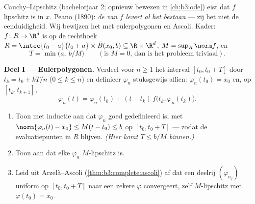 \begin{problem}[{Weekendopgave --- bestaan van oplossingen van $x'
= f(t, x)$ zonder Lipschitz}]\label{pb:b3:complete:1}
Cauchy--Lipschitz (bachelorjaar 2; opnieuw bewezen in
\cref{ch:b3:ode}) eist dat $f$ lipschitz is in $x$. Peano (1890):
\emph{de  van $f$ levert al het bestaan} --- zij het
niet de eenduidigheid. Wij bewijzen het met eulerpolygonen en
Ascoli. Kader: $f \colon R \to \R^d$ is  op de rechthoek $R
= \intcc{t_0 - a}{t_0 + a}\times \bar B(x_0, b) \subseteq
\R\times\R^d$, $M = \sup_R\norm f$, en
\[
T = \min\bigl(a,\ b/M\bigr)
\qquad (\text{is } M = 0 \text{, dan is het probleem triviaal}).
\]

\medskip
\noindent\textbf{Deel I --- Eulerpolygonen.} Verdeel voor $n \geq
1$ het interval $[t_0, t_0 + T]$ door $t_k = t_0 + kT/n$ ($0 \leq
k \leq n$) en definieer $\varphi_n$ stuksgewijs affien:
$\varphi_n(t_0) = x_0$ en, op $[t_k, t_{k+1}]$,
\[
\varphi_n(t) = \varphi_n(t_k) + (t -
t_k)\,f\bigl(t_k, \varphi_n(t_k)\bigr).
\]
\begin{enumerate}
  \item Toon met inductie aan dat $\varphi_n$ goed gedefinieerd
        is, met $\norm{\varphi_n(t) - x_0} \leq M(t - t_0) \leq b$
        op $[t_0, t_0 + T]$ --- zodat de evaluatiepunten in $R$
        blijven. \emph{(Hier komt $T \leq b/M$ binnen.)}
  \item Toon aan dat elke $\varphi_n$ $M$-lipschitz is.
  \item Leid uit Arzelà--Ascoli
        (\cref{thm:b3:complete:ascoli}) af dat een deelrij
        $(\varphi_{n_j})$ uniform op $[t_0, t_0 + T]$ naar een
        zekere $\varphi$ convergeert, zelf $M$-lipschitz met
        $\varphi(t_0) = x_0$.
\end{enumerate}


\end{problem}

